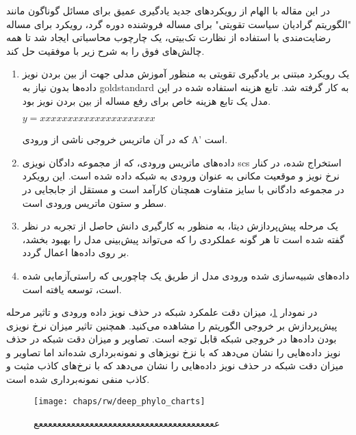 در این مقاله با الهام از رویکردهای جدید یادگیری عمیق  برای مسائل گوناگون مانند "الگوریتم گرادیان سیاست تقویتی" برای مساله فروشنده دوره گرد\cite{williams1992simple}،  رویکرد  \cite{selsam2018learning} برای مساله رضایت‌مندی با استفاده از نظارت تک‌بیتی، یک چارچوب محاسباتی ایجاد شد تا همه چالش‌های فوق را به شرح زیر با موفقیت حل کند.
\begin{enumerate}
	\item     یک رویکرد مبتنی بر یادگیری تقویتی به منظور آموزش مدلی جهت از بین بردن نویز داده‌ها بدون نیاز به \gls{goldstandard} به کار گرفته شد. تابع هزینه استفاده شده در این مدل یک تابع هزینه خاص برای رفع مساله از بین بردن نویز بود. 
    
    \begin{math}
    	y=xxxxxxxxxxxxxxxxxxxxx
    \end{math}

که در آن  ماتریس خروجی ناشی از ورودی A’ است. 
\item     داده‌های ماتریس ورودی، که از مجموعه دادگان نویزی \gls{scs} استخراج شده، در کنار نرخ نویز و موقعیت مکانی به عنوان ورودی به شبکه داده شده است.  این رویکرد در مجموعه دادگانی با سایز متفاوت همچنان کارآمد است و مستقل از جابجایی در سطر و ستون ماتریس ورودی است. 
\item یک مرحله پیش‌پردازش دیتا، به منظور به کارگیری دانش حاصل از تجربه در نظر گفته شده است تا هر گونه عملکردی را  که می‌تواند پیش‌بینی مدل را بهبود بخشد، بر روی داده‌ها اعمال گردد. 
\item داده‌های شبیه‌سازی شده ورودی مدل از طریق یک چاچوربی که راستی‌آزمایی شده است، توسعه یافته است. 
\end{enumerate}

در نمودار \ref{fig:ch_rw:deep_phylo_charts}، میزان دقت علمکرد شبکه در حذف نویز داده ورودی و تاثیر مرحله پیش‌پردازش بر خروجی الگوریتم را مشاهده می‌کنید. همچنین تاثیر میزان نرخ نویزی بودن داده‌ها در خروجی شبکه قابل توجه است. تصاویر  و  میزان دقت شبکه در حذف نویز داده‌هایی را نشان می‌دهد که با نزخ نویزهای   و  نمونه‌برداری شده‌اند اما  تصاویر  و  میزان دقت شبکه در حذف نویز داده‌هایی را نشان می‌دهد که با نرخ‌های کاذب مثبت  و کاذب منفی  نمونه‌برداری شده است.  


\begin{figure}[!ht]
	\centerline{\texttt{[image: chaps/rw/deep\_phylo\_charts]}}
	\caption{عععععععععععععععععععععععععععععععععععععععع}
	\label{fig:ch_rw:deep_phylo_charts}
\end{figure}

